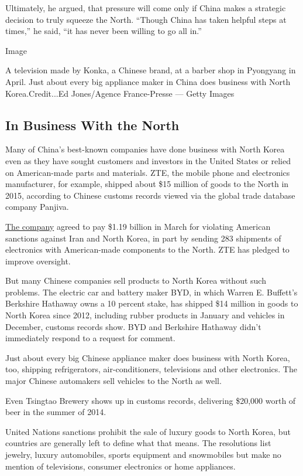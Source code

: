 Ultimately, he argued, that pressure will come only if China makes a
strategic decision to truly squeeze the North. ``Though China has taken
helpful steps at times,'' he said, ``it has never been willing to go all
in.''

Image

A television made by Konka, a Chinese brand, at a barber shop in
Pyongyang in April. Just about every big appliance maker in China does
business with North Korea.Credit...Ed Jones/Agence France-Presse ---
Getty Images

\hypertarget{in-business-with-the-north}{%
\subsection{In Business With the
North}\label{in-business-with-the-north}}

Many of China's best-known companies have done business with North Korea
even as they have sought customers and investors in the United States or
relied on American-made parts and materials. ZTE, the mobile phone and
electronics manufacturer, for example, shipped about \$15 million of
goods to the North in 2015, according to Chinese customs records viewed
via the global trade database company Panjiva.

\href{https://www.nytimes3xbfgragh.onion/2017/03/07/technology/zte-china-fine.html}{The
company} agreed to pay \$1.19 billion in March for violating American
sanctions against Iran and North Korea, in part by sending 283 shipments
of electronics with American-made components to the North. ZTE has
pledged to improve oversight.

But many Chinese companies sell products to North Korea without such
problems. The electric car and battery maker BYD, in which Warren E.
Buffett's Berkshire Hathaway owns a 10 percent stake, has shipped \$14
million in goods to North Korea since 2012, including rubber products in
January and vehicles in December, customs records show. BYD and
Berkshire Hathaway didn't immediately respond to a request for comment.

Just about every big Chinese appliance maker does business with North
Korea, too, shipping refrigerators, air-conditioners, televisions and
other electronics. The major Chinese automakers sell vehicles to the
North as well.

Even Tsingtao Brewery shows up in customs records, delivering \$20,000
worth of beer in the summer of 2014.

United Nations sanctions prohibit the sale of luxury goods to North
Korea, but countries are generally left to define what that means. The
resolutions list jewelry, luxury automobiles, sports equipment and
snowmobiles but make no mention of televisions, consumer electronics or
home appliances.

